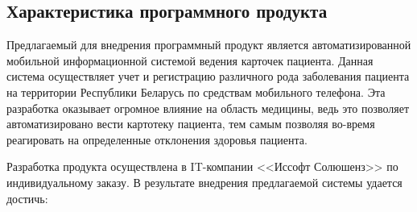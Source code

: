 









\FPround{}


\subsection{Характеристика программного продукта}

Предлагаемый для внедрения программный продукт является автоматизированной мобильной информационной системой ведения карточек пациента. Данная система осуществляет учет и регистрацию различного рода заболевания пациента на территории Республики Беларусь по средствам мобильного телефона. Эта разработка оказывает огромное  влияние на область медицины, ведь это позволяет автоматизировано вести картотеку пациента, тем самым позволяя во-время реагировать на определенные отклонения здоровья пациента.

Разработка продукта осуществлена в IT-компании <<Иссофт Солюшенз>> по индивидуальному заказу. В результате внедрения предлагаемой системы удается достичь:

